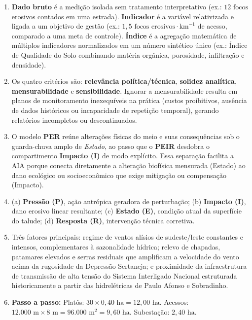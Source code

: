 \begin{boxGabarito}
\begin{enumerate}[leftmargin=1.6em, itemsep=4pt]
  \item \textbf{Dado bruto} é a medição isolada sem tratamento interpretativo (ex.: $12\text{ focos}$ erosivos contados em uma estrada). \textbf{Indicador} é a variável relativizada e ligada a um objetivo de gestão (ex.: $1{,}5\text{ focos erosivos}\cdot\text{km}^{-1}$ de acesso, comparado a uma meta de controle). \textbf{Índice} é a agregação matemática de múltiplos indicadores normalizados em um número sintético único (ex.: Índice de Qualidade do Solo combinando matéria orgânica, porosidade, infiltração e densidade).
  \item Os quatro critérios são: \textbf{relevância política/técnica}, \textbf{solidez analítica}, \textbf{mensurabilidade} e \textbf{sensibilidade}. Ignorar a mensurabilidade resulta em planos de monitoramento inexequíveis na prática (custos proibitivos, ausência de dados históricos ou incapacidade de repetição temporal), gerando relatórios incompletos ou descontinuados.
  \item O modelo \textbf{PER} reúne alterações físicas do meio e suas consequências sob o guarda-chuva amplo de \textit{Estado}, ao passo que o \textbf{PEIR} desdobra o compartimento \textbf{Impacto (I)} de modo explícito. Essa separação facilita a AIA porque conecta diretamente a alteração biofísica mensurada (Estado) ao dano ecológico ou socioeconômico que exige mitigação ou compensação (Impacto).
  \item (a) \textbf{Pressão (P)}, ação antrópica geradora de perturbação; (b) \textbf{Impacto (I)}, dano erosivo linear resultante; (c) \textbf{Estado (E)}, condição atual da superfície do talude; (d) \textbf{Resposta (R)}, intervenção técnica corretiva.
  \item Três fatores principais: regime de ventos alísios de sudeste/leste constantes e intensos, complementares à sazonalidade hídrica; relevo de chapadas, patamares elevados e serras residuais que amplificam a velocidade do vento acima da rugosidade da Depressão Sertaneja; e proximidade da infraestrutura de transmissão de alta tensão do Sistema Interligado Nacional estruturada historicamente a partir das hidrelétricas de Paulo Afonso e Sobradinho.
  \item \textbf{Passo a passo:}
  Platôs: $30 \times 0{,}40\text{ ha} = 12{,}00\text{ ha}$. Acessos: $12.000\text{ m} \times 8\text{ m} = 96.000\text{ m}^2 = 9{,}60\text{ ha}$. Subestação: $2{,}40\text{ ha}$.

\end{enumerate}
\end{boxGabarito}
